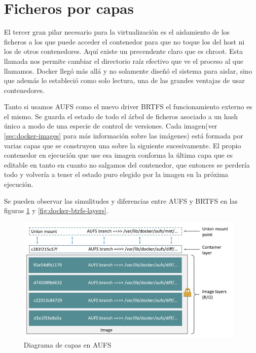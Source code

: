 \section{Ficheros por capas}
\label{sec:ficheros-capas}

El tercer gran pilar necesario para la virtualización es el aislamiento de los ficheros a los que puede acceder el contenedor para que no toque los del host ni los de otros contenedores. Aquí existe un precendente claro que es chroot\cite{linuxchroot}. Esta llamada nos permite cambiar el directorio raíz efectivo que ve el proceso al que llamamos. Docker llegó más allá y no solamente diseñó el sistema para aislar, sino que además lo estableció como solo lectura, una de las grandes ventajas de usar contenedores.

Tanto si usamos AUFS\cite{dockeraufs} como el nuevo driver BRTFS\cite{dockerbtrfs} el funcionamiento externo es el mismo. Se guarda el estado de todo el árbol de ficheros asociado a un hash único a modo de una especie de control de versiones. Cada imagen(ver \ref{sec:docker-images} para más información sobre las imágenes) está formada por varias capas que se construyen una sobre la siguiente sucesivamente. El propio contenedor en ejecución que use esa imagen conforma la última capa que es editable en tanto en cuanto no salgamos del contenedor, que entonces se perdería todo y volvería a tener el estado puro elegido por la imagen en la próxima ejecución.

Se pueden observar las simulitudes y diferencias entre AUFS y BRTFS en las figuras \ref{fig:docker-aufs-layers} y \ref{fig:docker-btrfs-layers}.

\begin{figure}[H]
    \centering
    \includegraphics[width=\textwidth]{../images/docker/aufs-layers.jpg}
    \caption{Diagrama de capas en AUFS \protect\cite{dockeraufs}}
    \label{fig:docker-aufs-layers}
\end{figure}

